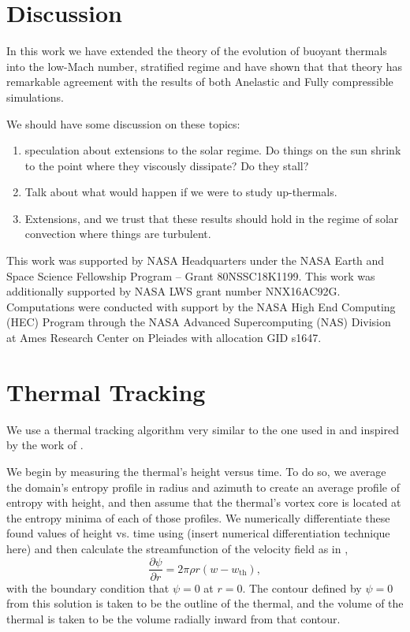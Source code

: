 \documentclass[twocolumn, amsmath, amsfonts, amssymb, trackchanges]{aastex62}
\begin{document}
\section{Discussion}
\label{sec:discussion}
In this work we have extended the theory of the evolution of buoyant thermals into the low-Mach number, stratified regime and have shown that that theory has remarkable agreement with the results of both Anelastic and Fully compressible simulations.

We should have some discussion on these topics:
\begin{enumerate}
\item speculation about extensions to the solar regime. Do things on the sun shrink to the point where they viscously dissipate? Do they stall?
\item Talk about what would happen if we were to study up-thermals.
\item Extensions, and we trust that these results should hold in the regime of solar convection where things are turbulent.
\end{enumerate}

\begin{acknowledgements}
This work was supported by NASA Headquarters under the NASA Earth and Space Science Fellowship Program -- Grant 80NSSC18K1199.
This work was additionally supported by  NASA LWS grant number NNX16AC92G.  
Computations were conducted with support by the NASA High End Computing (HEC) Program through the NASA  Advanced Supercomputing (NAS) Division at Ames Research Center on Pleiades with allocation GID s1647.
\end{acknowledgements}

\appendix
\section{Thermal Tracking}
\label{appendix:tracking}
We use a thermal tracking algorithm very similar to the one used in  \citet{lecoanet&jeevanjee2018} and inspired by the work of \citet{romps&all2015}. 

We begin by measuring the thermal's height versus time. 
To do so, we average the domain's entropy profile in radius and azimuth to create an average profile of entropy with height, and then assume that the thermal's vortex core is located at the entropy minima of each of those profiles.
We numerically differentiate these found values of height vs. time using (insert numerical differentiation technique here) and then calculate the streamfunction of the velocity field as in \citet{romps&all2015},
\begin{equation}
\frac{\partial \psi}{\partial r} = 2\pi \rho r (w - w_{\text{th}}),
\end{equation}
with the boundary condition that $\psi = 0$ at $r = 0$. The contour defined by $\psi = 0$ from this solution is taken to be the outline of the thermal, and the volume of the thermal is taken to be the volume radially inward from that contour.
\end{document}
